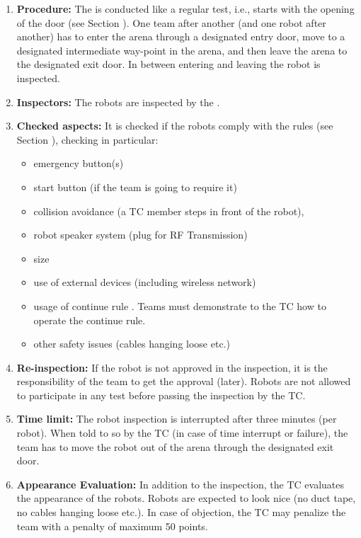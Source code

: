 \begin{enumerate}
	\item \textbf{Procedure:} The  is conducted like a regular test, i.e., starts with the opening of the door (see Section ). One team after another (and one robot after another) has to enter the arena through a designated entry door, move to a designated intermediate way-point in the arena, and then leave the arena to the designated exit door. In between entering and leaving the robot is inspected.
	\item \textbf{Inspectors:} The robots are inspected by the .
	\item \textbf{Checked aspects:} It is checked if the robots comply with the rules (see Section ), checking in particular:
	\begin{itemize}
		\item emergency button(s)
		\item start button (if the team is going to require it)
		\item collision avoidance (a TC member steps in front of the robot),
		\item robot speaker system (plug for RF Transmission)
		\item size
		\item use of external devices (including wireless network)
		\item usage of continue rule \label{rule:asrcontinue}. Teams must demonstrate to the TC how to operate the continue rule. 
		\item other safety issues (cables hanging loose etc.)
	\end{itemize}
	\item \textbf{Re-inspection:} If the robot is not approved in the inspection, it is the responsibility of the team to get the approval (later). Robots are not allowed to participate in any test before passing the inspection by the TC.
	\item \textbf{Time limit:} The robot inspection is interrupted after three minutes (per robot). When told to so by the TC (in case of time interrupt or failure), the team has to move the robot out of the arena through the designated exit door.
	\item \textbf{Appearance Evaluation:} In addition to the inspection, the TC evaluates the appearance of the robots. Robots are expected to look nice (no duct tape, no cables hanging loose etc.). In case of objection, the TC may penalize the team with a penalty of maximum 50 points.

\end{enumerate}
